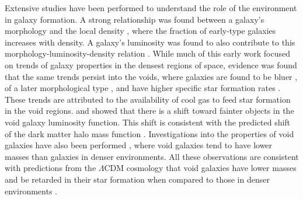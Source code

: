 Extensive studies have been performed to understand the role of the environment 
in galaxy formation.  A strong relationship was found between a galaxy's 
morphology and the local density \citep{Dressler80,Postman84}, where the 
fraction of early-type galaxies increases with density.  A galaxy's luminosity 
was found to also contribute to this morphology-luminosity-density relation 
\citep{Park07}.  While much of this early work focused on trends of galaxy 
properties in the densest regions of space, evidence was found that the same 
trends persist into the voids, where galaxies are found to be bluer 
\citep{Grogin99,Rojas04,Patiri06,vonBendaBeckmann08,Hoyle12}, of a later 
morphological type \citep{Grogin00,Rojas04,Park07}, and have higher specific 
star formation rates \citep[sSFR;][]{Rojas05,vonBendaBeckmann08,Moorman15,
Beygu16}.  These trends are attributed to the availability of cool gas to feed 
star formation in the void regions.  \cite{Hoyle05} and \cite{Moorman15} showed 
that there is a shift toward fainter objects in the void galaxy luminosity 
function.  This shift is consistent with the predicted shift of the dark matter 
halo mass function \citep{Goldberg05}.  Investigations into the  
properties of void galaxies have also been performed \citep{Kreckel12,
Moorman14}, where void galaxies tend to have lower  masses than 
galaxies in denser environments.  All these observations are consistent with 
predictions from the $\Lambda$CDM cosmology that void galaxies have lower masses 
and be retarded in their star formation when compared to those in denser 
environments \citep[e.g.,][]{Gottlober03,Goldberg05,Cen11}.

